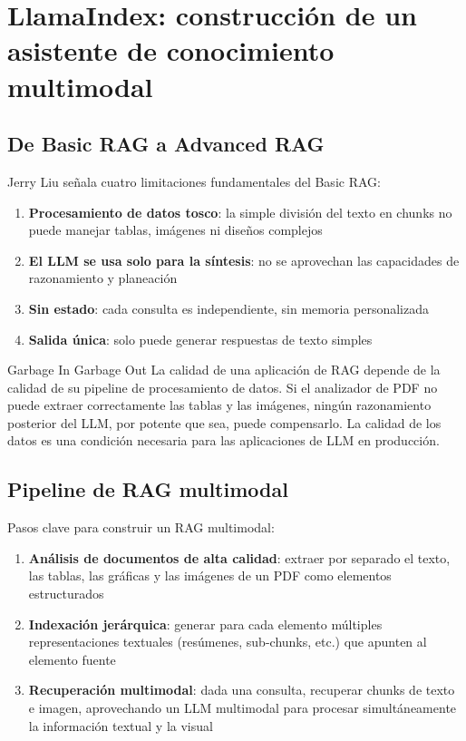\section{LlamaIndex: construcción de un asistente de conocimiento multimodal}

\subsection{De Basic RAG a Advanced RAG}

Jerry Liu señala cuatro limitaciones fundamentales del Basic RAG:
\begin{enumerate}
    \item \textbf{Procesamiento de datos tosco}: la simple división del texto en chunks no puede manejar tablas, imágenes ni diseños complejos
    \item \textbf{El LLM se usa solo para la síntesis}: no se aprovechan las capacidades de razonamiento y planeación
    \item \textbf{Sin estado}: cada consulta es independiente, sin memoria personalizada
    \item \textbf{Salida única}: solo puede generar respuestas de texto simples
\end{enumerate}

\begin{warningbox}{Garbage In Garbage Out}
La calidad de una aplicación de RAG depende de la calidad de su pipeline de procesamiento de datos. Si el analizador de PDF no puede extraer correctamente las tablas y las imágenes, ningún razonamiento posterior del LLM, por potente que sea, puede compensarlo. La calidad de los datos es una condición necesaria para las aplicaciones de LLM en producción.
\end{warningbox}

\subsection{Pipeline de RAG multimodal}

Pasos clave para construir un RAG multimodal:

\begin{enumerate}
    \item \textbf{Análisis de documentos de alta calidad}: extraer por separado el texto, las tablas, las gráficas y las imágenes de un PDF como elementos estructurados
    \item \textbf{Indexación jerárquica}: generar para cada elemento múltiples representaciones textuales (resúmenes, sub-chunks, etc.) que apunten al elemento fuente
    \item \textbf{Recuperación multimodal}: dada una consulta, recuperar chunks de texto e imagen, aprovechando un LLM multimodal para procesar simultáneamente la información textual y la visual
\end{enumerate}


